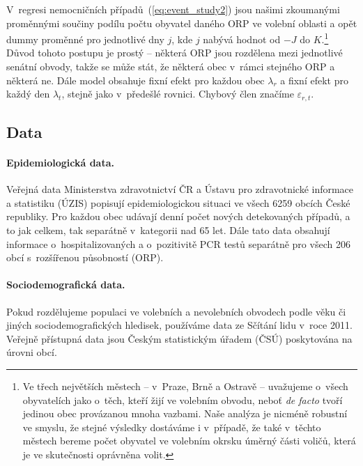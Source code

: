 V~regresi nemocničních případů~(\ref{eq:event_study2}) jsou našimi zkoumanými proměnnými sou\-či\-ny podílu počtu obyvatel daného ORP ve volební oblasti a opět dummy proměnné pro jednotlivé dny $j$, kde $j$ nabývá hodnot od $-J$ do $K$.\footnote{Ve třech největších městech -- v~Praze, Brně a Ostravě -- uvažujeme o~všech obyvatelích jako o~těch, kteří žijí ve volebním obvodu, neboť \textit{de facto} tvoří jedinou obec provázanou mnoha vazbami. Naše analýza je nicméně robustní ve smyslu, že stejné výsledky dostáváme i v~případě, že také v~těchto městech bereme počet obyvatel ve volebním okrsku úměrný části voličů, která je ve skutečnosti oprávněna volit.} Důvod tohoto postupu je prostý -- některá ORP jsou rozdělena mezi jednotlivé senátní obvody, takže se může stát, že některá obec v~rámci stejného ORP  a některá ne. Dále model obsahuje fixní efekt pro každou obec $\lambda_{r}$ a fixní efekt pro každý den $\lambda_{t}$, stejně jako v~předešlé rovnici. Chybový člen značíme $\varepsilon_{r,t}$.

\subsection*{Data}
\paragraph{Epidemiologická data.}  Veřejná data Ministerstva zdravotnictví ČR a Ústavu pro zdravotnické informace a statistiku (ÚZIS) popisují epidemiologickou situaci ve všech 6259 obcích České republiky. Pro každou obec udávají denní počet nových detekovaných případů, a to jak celkem, tak separátně v~kategorii nad 65 let. Dále tato data obsahují informace o~hospitalizovaných a o~pozitivitě PCR testů separátně pro všech 206 obcí s~rozšířenou působností (ORP). 

\paragraph{Sociodemografická data.} 
Pokud rozdělujeme populaci ve volebních a ne\-vo\-leb\-ních obvodech podle věku či jiných sociodemografických hledisek, používáme data ze Sčítání lidu v~roce 2011. Veřejně přístupná data jsou Českým statistickým úřadem (ČSÚ) poskytována na úrovni obcí.

